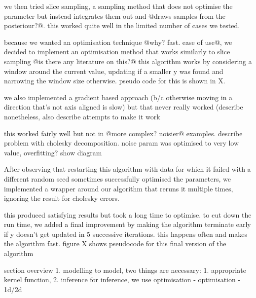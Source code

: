 \documentclass[a4paper,12pt,twoside,openright]{report}
\begin{document}



we then tried slice sampling, a sampling method that does not optimise the parameter but instead integrates them out and @draws samples from the posteriour?@. this worked quite well in the limited number of cases we tested.

because we wanted an optimisation technique @why? fast. ease of use@, we decided to implement an optimisation method that works similarly to slice sampling @is there any literature on this?@ this algorithm works by considering a window around the current value, updating if a smaller y was found and narrowing the window size otherwise. pseudo code for this is shown in X.

we also implemented a gradient based approach (b/c otherwise moving in a direction that's not axis aligned is slow) but that never really worked (describe nonetheless, also describe attempts to make it work

this worked fairly well but not in @more complex? noisier@ examples. describe problem with cholesky decomposition. noise param was optimised to very low value, overfitting? show diagram

After observing that restarting this algorithm with data for which it failed with a different random seed sometimes successfully optimised the parameters, we implemented a wrapper around our algorithm that reruns it multiple times, ignoring the result for cholesky errors.

this produced satisfying results but took a long time to optimise. to cut down the run time, we added a final improvement by making the algorithm terminate early if y doesn't get updated in 5 successive iterations. this happens often and makes the algorithm fast. figure X shows pseudocode for this final version of the algorithm







section overview
1. modelling
to model, two things are necessary: 1. appropriate kernel function, 2. inference
for inference, we use optimisation
- optimisation
- 1d/2d
\end{document}
